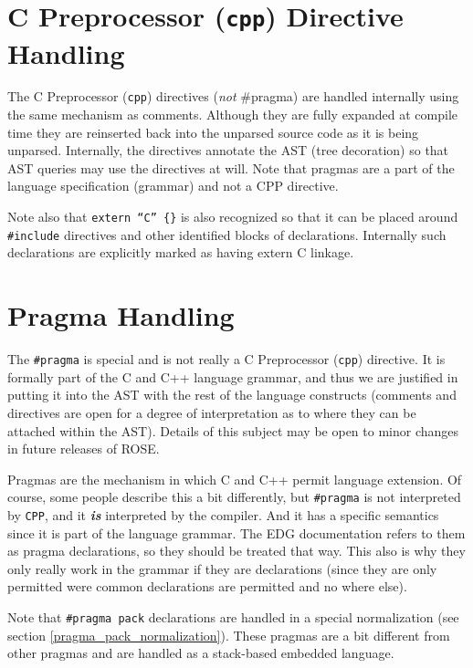 \section {C Preprocessor ({\tt cpp}) Directive Handling}
    The C Preprocessor ({\tt cpp}) directives ({\em not} \#pragma) are handled internally using the same mechanism as
comments.  Although they are fully expanded at compile time they are reinserted back
into the unparsed source code as it is being unparsed.  Internally, the directives annotate the AST
(tree decoration) so that AST queries may use the directives at will.
Note that pragmas are a part of the language specification (grammar) and not a CPP directive.

  Note also that {\tt extern ``C'' \{\}} is also recognized so that it can be
placed around {\tt \#include} directives and other identified blocks of declarations.
Internally such declarations are explicitly marked as having extern C linkage.

\section {Pragma Handling}
   The {\tt \#pragma} is special and is not really a C Preprocessor ({\tt cpp}) directive.
It is formally part of the C and C++ language grammar, and thus we are justified in putting it 
into the AST with the rest of the language constructs (comments and directives are open for 
a degree of interpretation as to where they can be attached within the AST). Details of
this subject may be open to minor changes in future releases of ROSE.

  Pragmas are the mechanism in which C and C++ permit language
extension.  Of course, some people describe this a bit differently,
but {\tt \#pragma} is not interpreted by {\tt CPP}, and it {\it {\bf is}} interpreted by the compiler.
And it has a specific semantics since it is part of the language grammar.
The EDG documentation refers to them as pragma declarations, so they should be 
treated that way. This also is why they only really work in the grammar if 
they are declarations (since they are only permitted were common declarations 
are permitted and no where else).

Note that {\tt \#pragma pack} declarations are handled in a special normalization
(see section \ref{pragma_pack_normalization}).  These pragmas are a bit different
from other pragmas and are handled as a stack-based embedded language.


